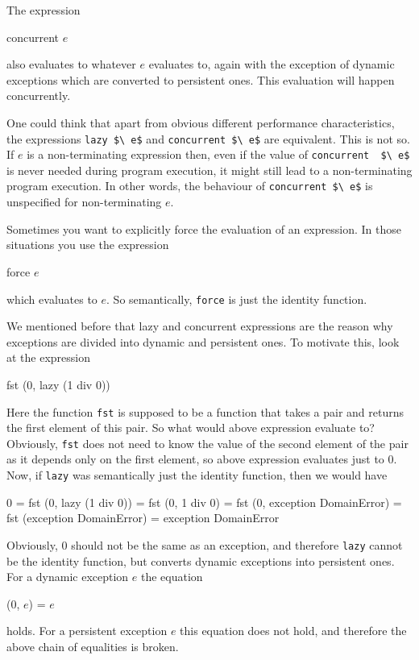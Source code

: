 \documentclass[11pt]{amsart}
\newcommand{\babelsrc}[1] {\lstinline!#1!}
\begin{document}
The expression
\begin{babellisting}
concurrent $e$
\end{babellisting}
also evaluates to whatever $e$ evaluates to, again with the exception of dynamic exceptions which are converted to persistent ones. This evaluation will happen concurrently.  

One could think that apart from obvious different performance characteristics, the expressions \babelsrc{lazy $\ e$} and \babelsrc{concurrent $\ e$} are equivalent. This is not so.
If $e$ is a non-terminating expression then, even if  the value of  \babelsrc{concurrent  $\ e$} is never needed during program execution, it might still lead to a non-terminating program execution. In other words, the behaviour of \babelsrc{concurrent $\ e$}  is unspecified for non-terminating $e$.

Sometimes you want to explicitly force the evaluation of an expression. In those situations you use the expression
\begin{babellisting}
force $e$
\end{babellisting}
which evaluates to $e$. So semantically, \babelsrc{force} is just the identity function. 

We mentioned before that lazy and concurrent expressions are the reason why exceptions are divided into dynamic and persistent ones. To motivate this, look at the expression
\begin{babellisting}
fst (0, lazy (1 div 0))
\end{babellisting}
Here the function \babelsrc{fst} is supposed to be a function that takes a pair and returns the first element of this pair. So what would above expression evaluate to? Obviously, \babelsrc{fst} does not need to know the value of the second element of the pair as it depends only on the first element, so above expression evaluates just to 0. Now, if \babelsrc{lazy} was semantically just the identity function, then we would have
\begin{babellisting}
0 = fst (0, lazy (1 div 0)) = fst (0, 1 div 0) = fst (0, exception DomainError) 
   = fst (exception DomainError) = exception DomainError
\end{babellisting}
Obviously, $0$ should not be the same as an exception, and therefore \babelsrc{lazy} cannot be the identity function, but converts dynamic exceptions into persistent ones. For a dynamic exception $e$ the equation
\begin{babellisting}
(0, $e$) = $e$
\end{babellisting}
holds. For a persistent exception $e$ this equation does not hold, and therefore the above chain of equalities is broken.
\end{document}
